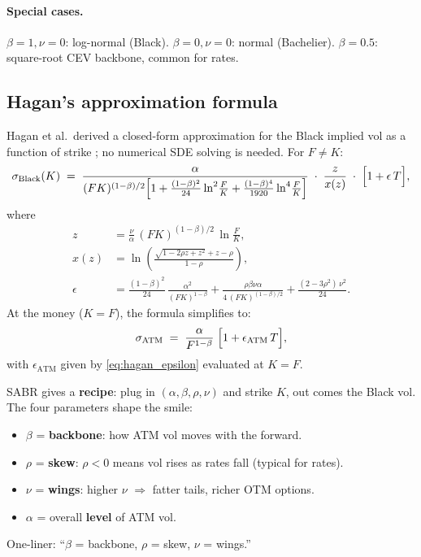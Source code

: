 \paragraph{Special cases.}
$\beta=1, \nu=0$: log-normal (Black).  $\beta=0, \nu=0$: normal
(Bachelier).  $\beta=0.5$: square-root CEV backbone, common for rates.

\subsection{Hagan's approximation formula}

Hagan et al.\ derived a closed-form approximation for the Black
implied vol as a function of strike \citeHagan; no numerical SDE
solving is needed.  For $F \neq K$:
\begin{equation}
  \sigma_{\text{Black}}(K) \;=\;
    \frac{\alpha}{(FK)^{(1-\beta)/2}
      \Bigl[1 + \frac{(1-\beta)^2}{24}\ln^2\!\frac{F}{K}
        + \frac{(1-\beta)^4}{1920}\ln^4\!\frac{F}{K}\Bigr]}
    \;\cdot\;
    \frac{z}{x(z)}
    \;\cdot\;
    \Bigl[1 + \epsilon\, T\Bigr],
  \label{eq:hagan_sabr}
\end{equation}
where
\begin{align}
  z &= \frac{\nu}{\alpha}\,(FK)^{(1-\beta)/2}\,\ln\frac{F}{K},
  \label{eq:hagan_z} \\
  x(z) &= \ln\!\left(\frac{\sqrt{1 - 2\rho z + z^2} + z - \rho}{1 - \rho}\right),
  \label{eq:hagan_xz} \\
  \epsilon &= \frac{(1-\beta)^2}{24}\,\frac{\alpha^2}{(FK)^{1-\beta}}
    + \frac{\rho\beta\nu\alpha}{4\,(FK)^{(1-\beta)/2}}
    + \frac{(2-3\rho^2)\,\nu^2}{24}.
  \label{eq:hagan_epsilon}
\end{align}
At the money ($K = F$), the formula simplifies to:
\begin{equation}
  \sigma_{\text{ATM}} \;=\;
    \frac{\alpha}{F^{1-\beta}}\;
    \Bigl[1 + \epsilon_{\text{ATM}}\, T\Bigr],
  \label{eq:hagan_atm}
\end{equation}
with $\epsilon_{\text{ATM}}$ given by \cref{eq:hagan_epsilon} evaluated at
$K = F$.

\begin{intuitionbox}
SABR gives a \textbf{recipe}: plug in $(\alpha, \beta, \rho, \nu)$
and strike $K$, out comes the Black vol.  The four parameters shape
the smile:
\begin{itemize}
  \item $\beta$ = \textbf{backbone}: how ATM vol moves with the
    forward.
  \item $\rho$ = \textbf{skew}: $\rho < 0$ means vol rises as rates
    fall (typical for rates).
  \item $\nu$ = \textbf{wings}: higher $\nu$ $\Rightarrow$ fatter
    tails, richer OTM options.
  \item $\alpha$ = overall \textbf{level} of ATM vol.
\end{itemize}
One-liner: ``$\beta$ = backbone, $\rho$ = skew, $\nu$ = wings.''
\end{intuitionbox}

